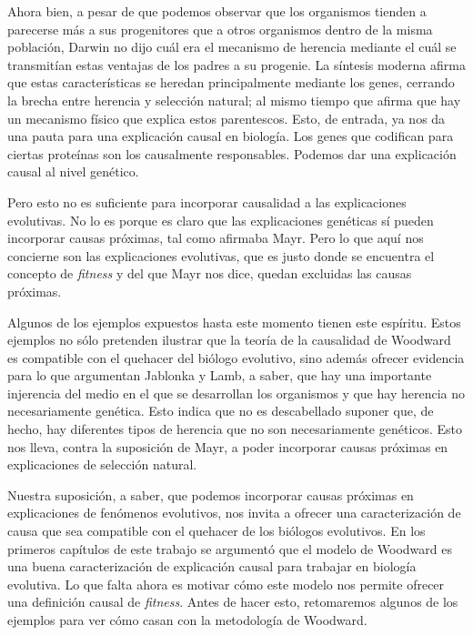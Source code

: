 Ahora bien, a pesar de que podemos observar que los organismos tienden a parecerse más a sus progenitores que a otros organismos dentro de la misma población, Darwin no dijo cuál era el mecanismo de herencia mediante el cuál se transmitían estas ventajas de los padres a su progenie. La síntesis moderna afirma que estas características se heredan principalmente mediante los genes, cerrando la brecha entre herencia y selección natural; al mismo tiempo que afirma que hay un mecanismo físico que explica estos parentescos. Esto, de entrada, ya nos da una pauta para una explicación causal en biología. Los genes que codifican para ciertas proteínas son los causalmente responsables. Podemos dar una explicación causal al nivel genético.

Pero esto no es suficiente para incorporar causalidad a las explicaciones evolutivas. No lo es porque es claro que las explicaciones genéticas sí pueden incorporar causas próximas, tal como afirmaba Mayr. Pero lo que aquí nos concierne son las explicaciones evolutivas, que es justo donde se encuentra el concepto de \emph{fitness} y del que Mayr nos dice, quedan excluidas las causas próximas.











Algunos de los ejemplos expuestos hasta este momento tienen este espíritu. Estos ejemplos no sólo pretenden ilustrar que la teoría de la causalidad de Woodward es compatible con el quehacer del biólogo evolutivo, sino además ofrecer evidencia para lo que argumentan Jablonka y Lamb, a saber, que hay una importante injerencia del medio en el que se desarrollan los organismos y que hay herencia no necesariamente genética. Esto indica que no es descabellado suponer que, de hecho, hay diferentes tipos de herencia que no son necesariamente genéticos. Esto nos lleva, contra la suposición de Mayr, a poder incorporar causas próximas en explicaciones de selección natural.

Nuestra suposición, a saber, que podemos incorporar causas próximas en explicaciones de fenómenos evolutivos, nos invita a ofrecer una caracterización de causa que sea compatible con el quehacer de los biólogos evolutivos. En los primeros capítulos de este trabajo se argumentó que el modelo de Woodward es una buena caracterización de explicación causal para trabajar en biología evolutiva. Lo que falta ahora es motivar cómo este modelo nos permite ofrecer una definición causal de \emph{fitness}. Antes de hacer esto, retomaremos algunos de los ejemplos para ver cómo casan con la metodología de Woodward.

